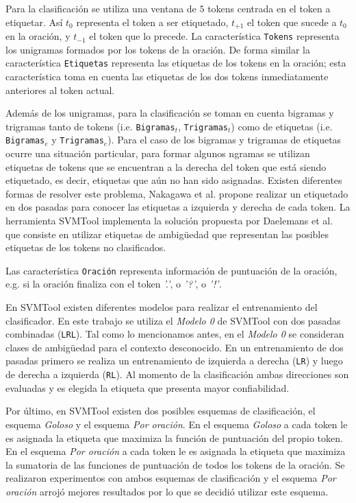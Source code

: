 \documentclass[runningheads,a4paper]{llncs}
\begin{document}
Para la clasificación se utiliza una ventana de $5$ tokens centrada en el token a etiquetar. Así $t_{0}$ representa el token a ser etiquetado, $t_{+1}$ el token que sucede a $t_{0}$ en la oración, y $t_{-1}$ el token que lo precede. La característica \texttt{\small Tokens} representa los unigramas formados por los tokens de la oración. De forma similar la característica \texttt{\small Etiquetas} representa las etiquetas de los tokens en la oración; esta característica toma en cuenta las etiquetas de los dos tokens inmediatamente anteriores al token actual.

Adem\'as de los unigramas, para la clasificaci\'on se toman en cuenta bigramas y trigramas tanto de tokens (i.e. \texttt{\small Bigramas$_{t}$}, \texttt{\small Trigramas$_{t}$}) como de etiquetas (i.e. \texttt{\small Bigramas$_{e}$} y \texttt{\small Trigramas$_{e}$}). Para el caso de los bigramas y trigramas de etiquetas ocurre una situaci\'on particular, para formar algunos ngramas se utilizan etiquetas de tokens que se encuentran a la derecha del token que está siendo etiquetado, es decir, etiquetas que aún no han sido asignadas. Existen diferentes formas de resolver este problema, Nakagawa et al.\cite{NAKAGAWA01} propone realizar un etiquetado en dos pasadas para conocer las etiquetas a izquierda y derecha de cada token. La herramienta SVMTool implementa la solución propuesta por Daelemans et al.\cite{DAELEMANS96} que consiste en utilizar etiquetas de ambig\"uedad que representan las posibles etiquetas de los tokens no clasificados.

Las caracter\'istica \texttt{\small Oraci\'on} representa información de puntuación de la oración, e.g. si la oración finaliza con el token \emph{'.'}, o \emph{'?'}, o \emph{'!'}.

En SVMTool existen diferentes modelos para realizar el entrenamiento del clasificador. En este trabajo se utiliza el \emph{Modelo 0} de SVMTool con dos pasadas combinadas (\texttt{\small LRL}). Tal como lo mencionamos antes, en el \emph{Modelo 0} se consideran clases de ambig\"uedad para el contexto desconocido. En un entrenamiento de dos pasadas primero se realiza un entrenamiento de izquierda a derecha (\texttt{\small LR}) y luego de derecha a izquierda (\texttt{\small RL}). Al momento de la clasificación ambas direcciones son evaluadas y es elegida la etiqueta que presenta mayor confiabilidad.

Por último, en SVMTool existen dos posibles esquemas de clasificación, el esquema \emph{Goloso} y el esquema \emph{Por oración}. En el esquema \emph{Goloso} a cada token le es asignada la etiqueta que maximiza la función de puntuación del propio token. En el esquema \emph{Por oración} a cada token le es asignada la etiqueta que maximiza la sumatoria de las funciones de puntuación de todos los tokens de la oración. Se realizaron experimentos con ambos esquemas de clasificación y el esquema \emph{Por oración} arrojó mejores resultados por lo que se decidió utilizar este esquema.
\end{document}
